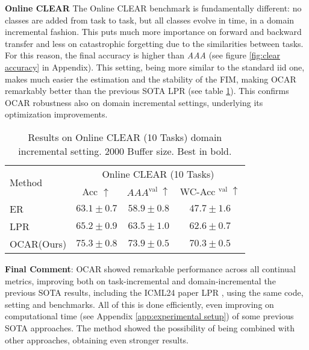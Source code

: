 \textbf{Online CLEAR}
The Online CLEAR benchmark is fundamentally different: no classes are added from task to task, but all classes evolve in time, in a domain incremental fashion. This puts much more importance on forward and backward transfer and less on catastrophic forgetting due to the similarities between tasks. For this reason, the final accuracy is higher than \textit{AAA} (see figure \ref{fig:clear accuracy} in Appendix). This setting, being more similar to the standard iid one, makes much easier the estimation and the stability of the FIM, making OCAR remarkably better than the previous SOTA LPR (see table \ref{tab:clear}). This confirms OCAR robustness also on domain incremental settings, underlying its optimization improvements. 
\begin{table}[h!]
    \caption{Results on Online CLEAR (10 Tasks) domain incremental setting. 2000 Buffer size. Best in bold.}\label{tab:clear}
    {%
    \begin{tabular}{l|ccc}
    \hline \multirow[t]{2}{*}{Method} & \multicolumn{3}{c}{Online CLEAR (10 Tasks)}  \\
    & Acc $\uparrow$ & $A A A^{\text {val }} \uparrow$ & WC-Acc ${ }^{\text {val }} \uparrow$ \\
    \midrule
    ER & $63.1 \pm 0.7$ & $58.9 \pm 0.8$ & $47.7 \pm 1.6$ \\ 
    LPR & $65.2 \pm 0.9$ & $63.5 \pm 1.0$ & $62.6 \pm 0.7$ \\
    \midrule
    OCAR(Ours) & $\mathbf{75.3} \pm 0.8$ & $\mathbf{73.9} \pm 0.5$ & $\mathbf{70.3} \pm 0.5$\\
    \bottomrule
    \end{tabular}
    }
\end{table}

\textbf{Final Comment}: OCAR showed remarkable performance across all continual metrics, improving both on task-incremental and domain-incremental the previous SOTA results, including the ICML24 paper LPR \cite{yoo2024layerwise}, using the same code, setting and benchmarks. All of this is done efficiently, even improving on computational time (see Appendix \ref{app:experimental setup}) of some previous SOTA approaches. The method showed the possibility of being combined with other approaches, obtaining even stronger results.




